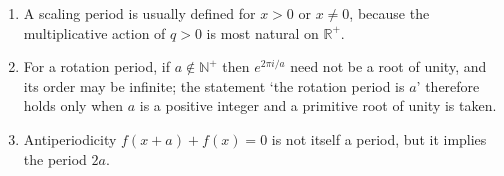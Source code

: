 \begin{remark}\label{rem:function_features_boundary}
\begin{enumerate}[label=(\roman*)]
    \item A scaling period is usually defined for $x>0$ or $x\neq 0$, because the multiplicative action of $q>0$ is most natural on $\mathbb{R}^+$.
    \item For a rotation period, if $a\notin\mathbb{N}^+$ then $e^{2\pi i/a}$ need not be a root of unity, and its order may be infinite; the statement `the rotation period is $a$' therefore holds only when $a$ is a positive integer and a primitive root of unity is taken.
    \item Antiperiodicity $f(x+a)+f(x)=0$ is not itself a period, but it implies the period $2a$.
\end{enumerate}
\end{remark}

